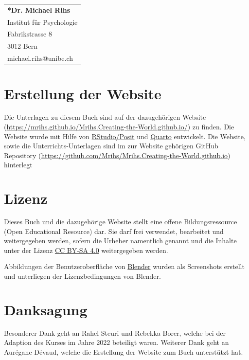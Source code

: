 \documentclass[
]{book}
\begin{document}
\begin{tabular}{@{}l}
\textbf{*Dr. Michael Rihs}\\
Institut für Psychologie \\
Fabrikstrasse 8 \\
3012 Bern \\
{michael.rihs@unibe.ch} \\
\end{tabular}

\newpage
\section*{Erstellung der Website}

Die Unterlagen zu diesem Buch sind auf der dazugehörigen Website
(\url{https://mrihs.github.io/Mrihs.Creating-the-World.github.io/}) zu
finden. Die Website wurde mit Hilfe von
\href{https://posit.co/download/rstudio-desktop/}{RStudio/Posit} und
\href{https://quarto.org}{Quarto} entwickelt. Die Website, sowie die
Unterrichts-Unterlagen sind im zur Website gehörigen GitHub Repository
(\url{https://github.com/Mrihs/Mrihs.Creating-the-World.github.io})
hinterlegt

\vspace{1em}
\section*{Lizenz}

Dieses Buch und die dazugehörige Website stellt eine offene
Bildungsressource (Open Educational Resource) dar. Sie darf frei
verwendet, bearbeitet und weitergegeben werden, sofern die Urheber
namentlich genannt und die Inhalte unter der Lizenz
\href{https://creativecommons.org/licenses/by-sa/4.0/deed.de}{CC BY-SA 4.0}
weitergegeben werden.

Abbildungen der Benutzeroberfläche von
\href{https://www.blender.org}{Blender} wurden als Screenshots erstellt
und unterliegen der Lizenzbedingungen von Blender.

\vspace{1em}
\section*{Danksagung}

Besonderer Dank geht an Rahel Steuri und Rebekka Borer, welche bei der
Adaption des Kurses im Jahre 2022 beteiligt waren. Weiterer Dank geht an
Aurégane Dévaud, welche die Erstellung der Website zum Buch unterstützt
hat.
\end{document}
